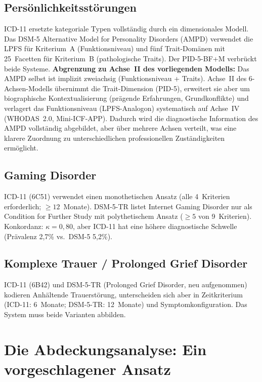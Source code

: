 \documentclass[11pt,a4paper]{article}
\begin{document}
\subsection{Pers\"onlichkeitsst\"orungen}

ICD-11 ersetzte kategoriale Typen vollst\"andig durch ein dimensionales Modell. Das DSM-5 Alternative Model for Personality Disorders (AMPD) verwendet die LPFS f\"ur Kriterium~A (Funktionsniveau) und f\"unf Trait-Dom\"anen mit 25~Facetten f\"ur Kriterium~B (pathologische Traits). Der PID-5-BF+M verbr\"uckt beide Systeme. \textbf{Abgrenzung zu Achse~II des vorliegenden Modells:} Das AMPD selbst ist implizit zweiachsig (Funktionsniveau + Traits). Achse~II des 6-Achsen-Modells \"ubernimmt die Trait-Dimension (PID-5), erweitert sie aber um biographische Kontextualisierung (pr\"agende Erfahrungen, Grundkonflikte) und verlagert das Funktionsniveau (LPFS-Analogon) systematisch auf Achse~IV (WHODAS~2.0, Mini-ICF-APP). Dadurch wird die diagnostische Information des AMPD vollst\"andig abgebildet, aber \"uber mehrere Achsen verteilt, was eine klarere Zuordnung zu unterschiedlichen professionellen Zust\"andigkeiten erm\"oglicht.

\subsection{Gaming Disorder}

ICD-11 (6C51) verwendet einen monothetischen Ansatz (alle 4~Kriterien erforderlich; $\geq 12$~Monate). DSM-5-TR listet Internet Gaming Disorder nur als \glqq Condition for Further Study\grqq{} mit polythetischem Ansatz ($\geq 5$ von 9~Kriterien). Konkordanz: $\kappa = 0{,}80$, aber ICD-11 hat eine h\"ohere diagnostische Schwelle (Pr\"avalenz 2,7\% vs.\ DSM-5 5,2\%).

\subsection{Komplexe Trauer / Prolonged Grief Disorder}

ICD-11 (6B42) und DSM-5-TR (Prolonged Grief Disorder, neu aufgenommen) kodieren Anh\"altende Trauerst\"orung, unterscheiden sich aber in Zeitkriterium (ICD-11: 6~Monate; DSM-5-TR: 12~Monate) und Symptomkonfiguration. Das System muss beide Varianten abbilden.


\section{Die Abdeckungsanalyse: Ein vorgeschlagener Ansatz}
\label{sec:abdeckung}
\end{document}
